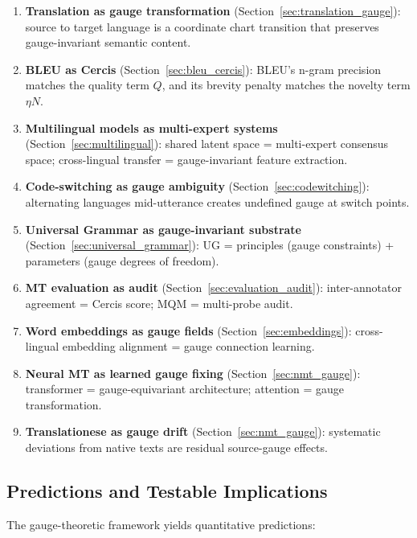 \documentclass[12pt,a4paper]{article}
\theoremstyle{remark}
\newcommand{\Cercis}{\textsf{Cercis}}
\begin{document}
\begin{enumerate}[leftmargin=*, label=(\arabic*)]
  \item \textbf{Translation as gauge transformation} (Section~\ref{sec:translation_gauge}):
        source to target language is a coordinate chart transition that
        preserves gauge-invariant semantic content.
  \item \textbf{BLEU as Cercis} (Section~\ref{sec:bleu_cercis}):
        BLEU's n-gram precision matches the quality term $Q$, and its
        brevity penalty matches the novelty term $\eta N$.
  \item \textbf{Multilingual models as multi-expert systems}
        (Section~\ref{sec:multilingual}): shared latent space = multi-expert
        consensus space; cross-lingual transfer = gauge-invariant feature extraction.
  \item \textbf{Code-switching as gauge ambiguity} (Section~\ref{sec:codewitching}):
        alternating languages mid-utterance creates undefined gauge at switch points.
  \item \textbf{Universal Grammar as gauge-invariant substrate}
        (Section~\ref{sec:universal_grammar}): UG = principles (gauge constraints)
        + parameters (gauge degrees of freedom).
  \item \textbf{MT evaluation as audit} (Section~\ref{sec:evaluation_audit}):
        inter-annotator agreement = \Cercis{} score; MQM = multi-probe audit.
  \item \textbf{Word embeddings as gauge fields} (Section~\ref{sec:embeddings}):
        cross-lingual embedding alignment = gauge connection learning.
  \item \textbf{Neural MT as learned gauge fixing} (Section~\ref{sec:nmt_gauge}):
        transformer = gauge-equivariant architecture; attention = gauge transformation.
  \item \textbf{Translationese as gauge drift} (Section~\ref{sec:nmt_gauge}):
        systematic deviations from native texts are residual source-gauge effects.
\end{enumerate}

\subsection{Predictions and Testable Implications}

The gauge-theoretic framework yields quantitative predictions:
\end{document}
